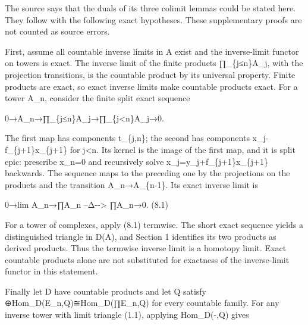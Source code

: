 \documentclass[11pt]{article}
\begin{document}
The source says that the duals of its three colimit lemmas could be stated here. They follow with the following exact hypotheses. These supplementary proofs are not counted as source errors.

First,\allowbreak{} assume all countable inverse limits in A exist and the inverse-limit functor on towers is exact. The inverse limit of the finite products ∏\_\allowbreak{}\{j≤n\}A\_\allowbreak{}j,\allowbreak{} with the projection transitions,\allowbreak{} is the countable product by its universal property. Finite products are exact,\allowbreak{} so exact inverse limits make countable products exact. For a tower A\_\allowbreak{}n,\allowbreak{} consider the finite split exact sequence

0\allowbreak{}→A\_\allowbreak{}n\allowbreak{}→∏\_\allowbreak{}\{j≤n\}A\_\allowbreak{}j\allowbreak{}→∏\_\allowbreak{}\{j<n\}A\_\allowbreak{}j\allowbreak{}→0.

The first map has components t\_\allowbreak{}\{j,\allowbreak{}n\}; the second has components x\_\allowbreak{}j-f\_\allowbreak{}\{j\allowbreak{}+1\}x\_\allowbreak{}\{j\allowbreak{}+1\} for j\textless n. Its kernel is the image of the first map,\allowbreak{} and it is split epic:\allowbreak{} prescribe x\_\allowbreak{}n\allowbreak{}=0 and recursively solve x\_\allowbreak{}j\allowbreak{}=y\_\allowbreak{}j\allowbreak{}+f\_\allowbreak{}\{j\allowbreak{}+1\}x\_\allowbreak{}\{j\allowbreak{}+1\} backwards. The sequence maps to the preceding one by the projections on the products and the transition A\_\allowbreak{}n\allowbreak{}→A\_\allowbreak{}\{n-1\}. Its exact inverse limit is

0\allowbreak{}→lim A\_\allowbreak{}n\allowbreak{}→∏A\_\allowbreak{}n --Δ-\allowbreak{}-> ∏A\_\allowbreak{}n\allowbreak{}→0. (8.1)\allowbreak{}

For a tower of complexes,\allowbreak{} apply (8.1)\allowbreak{} termwise. The short exact sequence yields a distinguished triangle in D(A)\allowbreak{},\allowbreak{} and Section 1 identifies its two products as derived products. Thus the termwise inverse limit is a homotopy limit. Exact countable products alone are not substituted for exactness of the inverse-limit functor in this statement.

Finally let D have countable products and let Q satisfy \allowbreak{}⊕Hom\_\allowbreak{}D(E\_\allowbreak{}n,\allowbreak{}Q)\allowbreak{}≅Hom\_\allowbreak{}D(∏E\_\allowbreak{}n,\allowbreak{}Q)\allowbreak{} for every countable family. For any inverse tower with limit triangle (1.1)\allowbreak{},\allowbreak{} applying Hom\_\allowbreak{}D(-,\allowbreak{}Q)\allowbreak{} gives
\end{document}

